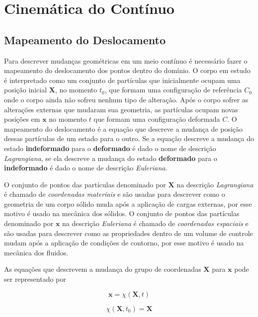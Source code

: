 \chapter{Cinemática do Contínuo}
\section{Mapeamento do Deslocamento}
Para descrever mudanças geométricas em um meio contínuo é necessário fazer o mapeamento do deslocamento dos pontos dentro do domínio. O corpo em estudo é interpretado como um conjunto de partículas que inicialmente ocupam uma posição inicial $\mathbf{X}$, no momento $t_0$, que formam uma configuração de referência $C_0$ onde o corpo ainda não sofreu nenhum tipo de alteração. Após o corpo sofrer as alterações externas que mudaram sua geometria, as partículas ocupam novas posições em $\mathbf{x}$ no momento $t$ que formam uma configuração deformada $C$. O mapeamento do deslocamento é a equação que descreve a mudança de posição dessas partículas de um estado para o outro. Se a equação descreve a mudança do estado \textbf{indeformado} para o \textbf{deformado} é dado o nome de descrição \textit{Lagrangiana}, se ela descreve a mudança do estado \textbf{deformado} para o \textbf{indeformado} é dado o nome de descrição \textit{Euleriana}. 

O conjunto de pontos das partículas denominado por $\mathbf{X}$ na descrição \textit{Lagrangiana} é chamado de \textit{coordenadas materiais} e são usadas para descrever como o geometria de um corpo sólido muda após a aplicação de cargas externas, por esse motivo é usado na mecânica dos sólidos. O conjunto de pontos das partículas denominado por $\mathbf{x}$ na descrição \textit{Euleriana} é chamado de \textit{coordenadas espaciais} e são usadas para descrever como as propriedades dentro de um volume de controle mudam após a aplicação de condições de contorno, por esse motivo é usado na mecânica dos fluidos.

As equações que descrevem a mudança do grupo de coordenadas $\mathbf{X}$ para $\mathbf{x}$ pode ser representado por

\begin{equation}
	\mathbf{x} = \chi(\mathbf{X}, t)
\end{equation}

\begin{equation}
	\chi(\mathbf{X}, t_0) = \mathbf{X}
\end{equation}


